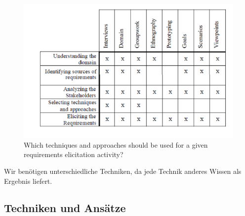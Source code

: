 \begin{figure}[!h]
	\centering
	\includegraphics[scale=0.6]{img/elicitation_techniques.png}
	\caption{Which techniques and approaches should be used for a given
		requirements elicitation activity?}
\end{figure}

Wir benötigen unterschiedliche Techniken, da jede Technik anderes Wissen als Ergebnis liefert.

\subsection{Techniken und Ansätze}
